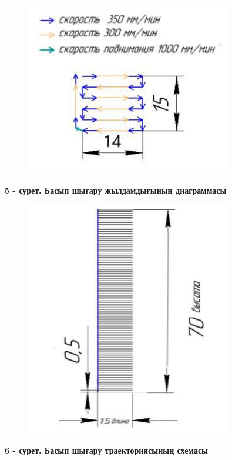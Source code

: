 \begin{figure}[H]
	\centering
	\includegraphics[width=0.8\textwidth]{media/ict2/image191}
	\caption*{}
\end{figure}


{\bfseries 5 - сурет. Басып шығару жылдамдығының диаграммасы}


\begin{figure}[H]
	\centering
	\includegraphics[width=0.8\textwidth]{media/ict2/image192}
	\caption*{}
\end{figure}


{\bfseries 6 - сурет. Басып шығару траекториясының схемасы}

